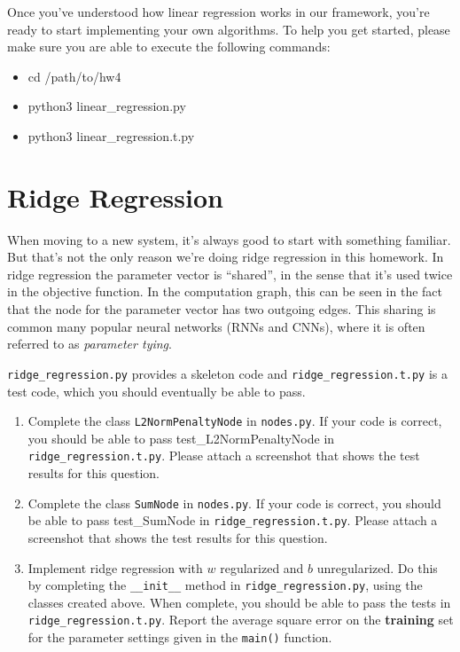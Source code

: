 \documentclass{article}
\theoremstyle{plain}
\theoremstyle{definition}
\begin{document}
Once you've understood how linear regression works in our framework,
you're ready to start implementing your own algorithms. To help you get started, please make sure you are able to execute the following commands:
\begin{itemize}
    \item cd /path/to/hw4
    \item python3 linear\_regression.py
    \item python3 linear\_regression.t.py
\end{itemize}

\section{Ridge Regression}

When moving to a new system, it's always good to start with something
familiar. But that's not the only reason we're doing ridge regression
in this homework. In ridge regression the
parameter vector is ``shared'', in the sense that it's used twice
in the objective function. In the computation graph, this can be seen
in the fact that the node for the parameter vector has two outgoing
edges. 
This sharing is common many popular neural networks (RNNs and CNNs), where it is often referred to as \emph{parameter tying}.

\texttt{ridge\_regression.py} provides a skeleton code
and \texttt{ridge\_regression.t.py} is a test code, which you should
eventually be able to pass.
\begin{enumerate}
\setcounter{enumi}{\value{saveenum}}
\item Complete the class \texttt{L2NormPenaltyNode} in \texttt{nodes.py}. If your code is correct, you should be able to pass test\_L2NormPenaltyNode in \texttt{ridge\_regression.t.py}. Please attach a screenshot that shows the test results for this question. 

\item Complete the class \texttt{SumNode} in \texttt{nodes.py}. If your code is correct, you should be able to pass test\_SumNode in \texttt{ridge\_regression.t.py}. Please attach a screenshot that shows the test results for this question.
\item Implement ridge regression with $w$ regularized and $b$ unregularized.
Do this by completing the \texttt{\_\_init\_\_} method in \texttt{ridge\_regression.py},
using the classes created above. When complete, you should be able
to pass the tests in \texttt{ridge\_regression.t.py}. Report the average
square error on the \textbf{training} set for the parameter settings
given in the \texttt{main()} function.
\setcounter{saveenum}{\value{enumi}}
\end{enumerate}
\end{document}
